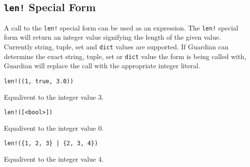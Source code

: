 
\subsection{\texttt{len!} Special Form}
{
	A call to the \texttt{len!} special form can be used as an expression.
	The \texttt{len!} special form will return an integer value signifying
	the length of the given value. Currently string, tuple, set
	and \texttt{dict} values are supported.
	If Guardian can determine the exact string, tuple, set or \texttt{dict}
	value the form is being called with, Guardian will replace the call with
	the appropriate integer literal.
	
	\begin{itemize}
	{
		\item \texttt{len!((1, true, 3.0))}
		
			Equalivent to the integer value 3.
		
		\item \texttt{len!([<bool>])}
		
			Equalivent to the integer value 0.
		
		\item \texttt{len!(\{1, 2, 3\} | \{2, 3, 4\})}
		
			Equalivent to the integer value 4.
	}
	\end{itemize}
}


















